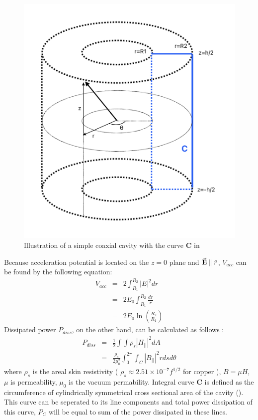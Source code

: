 \documentclass{article}
\begin{document}
\begin{figure}[H]
    \centering
    \includegraphics[width=.6\textwidth]{../../../figures/illustrations/rhodo_integral_curve.pdf}
    \caption{Illustration of a simple coaxial cavity with the curve \textbf{C} in }
    \label{fig:int_curve}
\end{figure}
Because acceleration potential is located on the $z=0$ plane and $\vec{\textbf{E}} \parallel \hat{r}$, $V_{acc}$ can be found by the following equation:
\begin{eqnarray} 
    V_{acc} &=& 2 \int_{R_1}^{R_2} |E|^2 dr \\
            &=& 2 E_0 \int_{R_1}^{R_2} \frac{dr}{r} \\
            &=& 2 E_0 \ln(\frac{R_2}{R_1}) \label{eq:v_acc}
\end{eqnarray}
Dissipated power $P_{diss}$, on the other hand, can be calculated as follows \cite{rf}:
\begin{eqnarray} 
    P_{diss} &=& \frac{1}{2} \int \int \rho_s | H_{||} |^2 dA \nonumber \\
             &=& \frac{\rho_s}{2\mu_0^2} \int_0^{2\pi} \int_C | B_{||} |^2 r ds d\theta \label{eq:p_diss_C_curve}
\end{eqnarray}
where $\rho_s$ is the areal skin resistivity ( $\rho_s \approx 2.51 \times 10^{-7} f^{1/2}$ for copper \cite{rhodo_pottier} ), $B=\mu H$, $\mu$ is permeability, $\mu_0$ is the vacuum permability. 
Integral curve \textbf{C} is defined as the circumference of cylindrically symmetrical cross sectional area of the cavity ().
This curve can be seperated to its line components and total power dissipation of this curve, $P_C$ will be equal to sum of the power dissipated in these lines.
\end{document}
